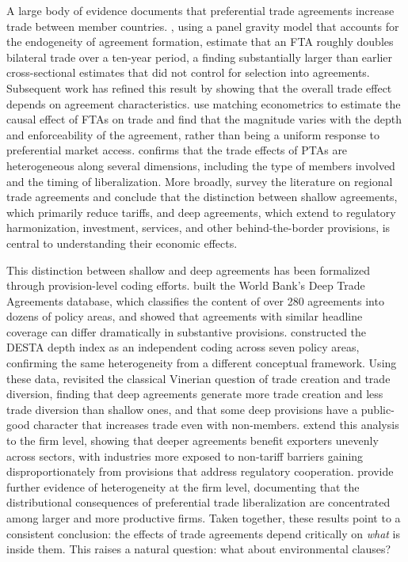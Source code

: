 \documentclass[12pt]{article}
\begin{document}
A large body of evidence documents that preferential trade agreements increase trade between member countries. \citet{baier2007}, using a panel gravity model that accounts for the endogeneity of agreement formation, estimate that an FTA roughly doubles bilateral trade over a ten-year period, a finding substantially larger than earlier cross-sectional estimates that did not control for selection into agreements. Subsequent work has refined this result by showing that the overall trade effect depends on agreement characteristics. \citet{baier2009} use matching econometrics to estimate the causal effect of FTAs on trade and find that the magnitude varies with the depth and enforceability of the agreement, rather than being a uniform response to preferential market access. \citet{medvedev2010} confirms that the trade effects of PTAs are heterogeneous along several dimensions, including the type of members involved and the timing of liberalization. More broadly, \citet{freund2010} survey the literature on regional trade agreements and conclude that the distinction between shallow agreements, which primarily reduce tariffs, and deep agreements, which extend to regulatory harmonization, investment, services, and other behind-the-border provisions, is central to understanding their economic effects.

This distinction between shallow and deep agreements has been formalized through provision-level coding efforts. \citet{hofmann2017} built the World Bank's Deep Trade Agreements database, which classifies the content of over 280 agreements into dozens of policy areas, and showed that agreements with similar headline coverage can differ dramatically in substantive provisions. \citet{dur2014} constructed the DESTA depth index as an independent coding across seven policy areas, confirming the same heterogeneity from a different conceptual framework. Using these data, \citet{mattoo2022} revisited the classical Vinerian question of trade creation and trade diversion, finding that deep agreements generate more trade creation and less trade diversion than shallow ones, and that some deep provisions have a public-good character that increases trade even with non-members. \citet{neri2023} extend this analysis to the firm level, showing that deeper agreements benefit exporters unevenly across sectors, with industries more exposed to non-tariff barriers gaining disproportionately from provisions that address regulatory cooperation. \citet{baccini2017} provide further evidence of heterogeneity at the firm level, documenting that the distributional consequences of preferential trade liberalization are concentrated among larger and more productive firms. Taken together, these results point to a consistent conclusion: the effects of trade agreements depend critically on \emph{what} is inside them. This raises a natural question: what about environmental clauses?
\end{document}
